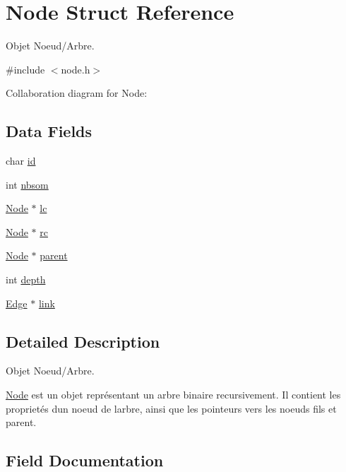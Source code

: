 \hypertarget{struct_node}{}\section{Node Struct Reference}
\label{struct_node}


Objet Noeud/\+Arbre.  




{\ttfamily \#include $<$node.\+h$>$}



Collaboration diagram for Node\+:
\subsection*{Data Fields}
\begin{DoxyCompactItemize}
\item 
char \hyperlink{struct_node_af749ccd9c242573390416d80accd7b39}{id}
\item 
int \hyperlink{struct_node_a86ce04d133292adc1adeed43958d5893}{nbsom}
\item 
\hyperlink{struct_node}{Node} $\ast$ \hyperlink{struct_node_ae311e29d2a6e2676fbb6d46f243cad7b}{lc}
\item 
\hyperlink{struct_node}{Node} $\ast$ \hyperlink{struct_node_adb6c1c6fd585f28f8e933f88708f40a0}{rc}
\item 
\hyperlink{struct_node}{Node} $\ast$ \hyperlink{struct_node_a15358e51f4bc699859aef344484ae4a8}{parent}
\item 
int \hyperlink{struct_node_acb5ba97551079e0b072c62c21d784ac5}{depth}
\item 
\hyperlink{struct_edge}{Edge} $\ast$ \hyperlink{struct_node_a33abcf13b3a22a82ead9b91fed7b2221}{link}
\end{DoxyCompactItemize}


\subsection{Detailed Description}
Objet Noeud/\+Arbre. 

\hyperlink{struct_node}{Node} est un objet représentant un arbre binaire recursivement. Il contient les proprietés d\textquotesingle{}un noeud de l\textquotesingle{}arbre, ainsi que les pointeurs vers les noeuds fils et parent. 

\subsection{Field Documentation}
\hypertarget{struct_node_acb5ba97551079e0b072c62c21d784ac5}{}
